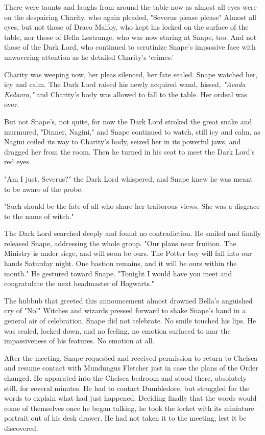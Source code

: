 There were taunts and laughs from around the table now as almost all eyes were on the despairing Charity, who again pleaded, "Severus{\el} please{\el} please{\el}" Almost all eyes, but not those of Draco Malfoy, who kept his locked on the surface of the table, nor those of Bella Lestrange, who was now staring at Snape, too. And not those of the Dark Lord, who continued to scrutinize Snape's impassive face with unwavering attention as he detailed Charity's `crimes.'

Charity was weeping now, her pleas silenced, her fate sealed. Snape watched her, icy and calm. The Dark Lord raised his newly acquired wand, hissed, \emph{"Avada Kedavra,"} and Charity's body was allowed to fall to the table. Her ordeal was over.

But not Snape's, not quite, for now the Dark Lord stroked the great snake and murmured, "Dinner, Nagini," and Snape continued to watch, still icy and calm, as Nagini coiled its way to Charity's body, seized her in its powerful jaws, and dragged her from the room. Then he turned in his seat to meet the Dark Lord's red eyes.

"Am I just, Severus?" the Dark Lord whispered, and Snape knew he was meant to be aware of the probe.

"Such should be the fate of all who share her traitorous views. She was a disgrace to the name of witch."

The Dark Lord searched deeply and found no contradiction. He smiled and finally released Snape, addressing the whole group. "Our plans near fruition. The Ministry is under siege, and will soon be ours. The Potter boy will fall into our hands Saturday night. One bastion remains, and it will be ours within the month." He gestured toward Snape. "Tonight I would have you meet and congratulate the next headmaster of Hogwarts."

The hubbub that greeted this announcement almost drowned Bella's anguished cry of "No!" Witches and wizards pressed forward to shake Snape's hand in a general air of celebration. Snape did not celebrate. No smile touched his lips. He was sealed, locked down, and no feeling, no emotion surfaced to mar the impassiveness of his features. No emotion at all.

After the meeting, Snape requested and received permission to return to Chelsea and resume contact with Mundungus Fletcher just in case the plans of the Order changed. He apparated into the Chelsea bedroom and stood there, absolutely still, for several minutes. He had to contact Dumbledore, but struggled for the words to explain what had just happened. Deciding finally that the words would come of themselves once he began talking, he took the locket with its miniature portrait out of his desk drawer. He had not taken it to the meeting, lest it be discovered.

